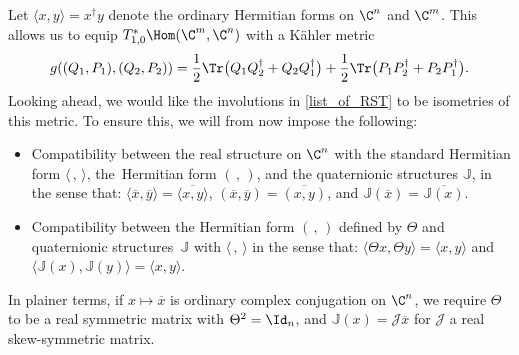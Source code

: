 \begin{Remark}%
	Let $\langle x,y\rangle=x^\dagger y$ denote the ordinary Hermitian forms on $\C^n$ and $\C^m$. This allows us to equip $T^*_{1,0}\Hom(\C^m,\C^n)$ with a K\"{a}hler metric
	\begin{equation}\label{metric}
		g((Q_1,P_1),(Q_2,P_2))=\frac{1}{2}\Tr\bigl(Q_1Q_2^\dagger+Q_2Q_1^\dagger\bigr)+\frac{1}{2}\Tr\bigl(P_1P_2^\dagger+P_2P_1^\dagger\bigr).
	\end{equation}
	Looking ahead, we would like the involutions in \eqref{list_of_RST} to be isometries of this metric. To ensure this, we will from now impose the following:
	\begin{itemize}\itemsep=0pt
		\item Compatibility between the real structure on $\C^n$ with the standard Hermitian form $\langle \,,\,\rangle$, the~Hermitian form $(\,,\,)$, and the quaternionic structures $\mathbb{J}$, in the sense that: $\langle\overline{x},\overline{y}\rangle=\overline{\langle x, y\rangle}$, $(\overline{x},\overline{y})=\overline{(x,y)}$, and $\mathbb{J}(\overline{x})=\overline{\mathbb{J}(x)}$.
		\item Compatibility between the Hermitian form $(\,,\,)$ defined by $\Theta$ and quaternionic structures~$\mathbb{J}$ with $\langle\,,\,\rangle$ in the sense that: $\langle \Theta x,\Theta y\rangle=\langle x,y\rangle$ and $\langle\mathbb{J}(x),\mathbb{J}(y)\rangle=\langle x,y\rangle$.
	\end{itemize}
	In plainer terms, if $x\mapsto\overline{x}$ is ordinary complex conjugation on $\C^n$, we require $\Theta$ to be a real symmetric matrix with $\Theta^2=\Id_n$, and $\mathbb{J}(x)=\mathcal{J}\overline{x}$ for $\mathcal{J}$ a real skew-symmetric matrix.
\end{Remark}
